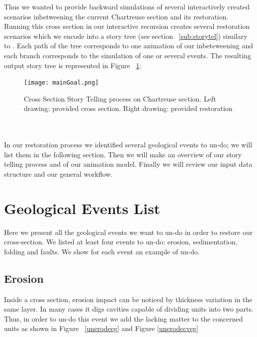 \documentclass[12pt, a4paper]{report} %
\begin{document}
Thus we wanted to provide backward simulations of several interactively created scenarios inbetweening the current Chartreuse section and its restoration. Running this cross section in our interactive recursion creates several restoration scenarios which we encode into a story tree (see section ~\ref{sub:storytel}) similary to \cite{lidal}. Each path of the tree corresponds to one animation of our inbeteweening and each branch corresponds to the simulation of one or several events. The resulting output story tree is represented in Figure ~\ref{maingoal}:
 \begin{figure}[H]
	\centering
	\texttt{[image: mainGoal.png]}
	\caption{Cross Section Story Telling process on Chartreuse section. Left drawing: provided cross section. Right drawing: provided restoration}
	\label{maingoal}
\end{figure}\\\\
In our restoration process we identified several geological events to un-do; we will list them in the following section.
Then we will make an overview of our story telling process and of our animation model. Finally we will review our input data structure and our general workflow.

\section{Geological Events List}
Here we present all the geological events we want to un-do in order to restore our cross-section.
We listed at least four events to un-do: erosion, sedimentation, folding and faults. We show for each event an example of un-do.
\subsection{Erosion}
Inside a cross section, erosion impact can be noticed by thickness variation in the same layer.
In many cases it digs cavities capable of dividing units into two parts. Thus, in order to un-do this event we add the lacking matter to the concerned units as shown in Figure ~\ref{unerodeeg} and Figure \ref{unerodecveg}
\end{document}
